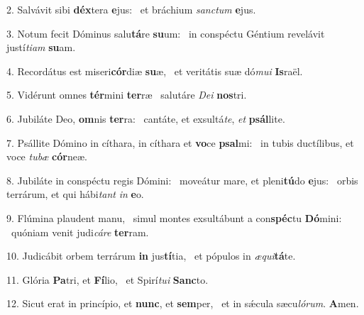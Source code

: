 2. Salvávit sibi \textbf{déx}tera \textbf{e}jus: \ast\  et bráchium \textit{sanc}\textit{tum} \textbf{e}jus.\

3. Notum fecit Dóminus salu\textbf{tá}re \textbf{su}um: \ast\  in conspéctu Géntium revelávit justí\textit{ti}\textit{am} \textbf{su}am.\

4. Recordátus est miseri\textbf{cór}diæ \textbf{su}æ, \ast\  et veritátis suæ dó\textit{mu}\textit{i} \textbf{Is}raël.\

5. Vidérunt omnes \textbf{tér}mini \textbf{ter}ræ \ast\  salutáre \textit{De}\textit{i} \textbf{nos}tri.\

6. Jubiláte Deo, \textbf{om}nis \textbf{ter}ra: \ast\  cantáte, et exsultá\textit{te}, \textit{et} \textbf{psál}lite.\

7. Psállite Dómino in cíthara, in cíthara et \textbf{vo}ce \textbf{psal}mi: \ast\  in tubis ductílibus, et voce \textit{tu}\textit{bæ} \textbf{cór}neæ.\

8. Jubiláte in conspéctu regis Dómini: \dag\  moveátur mare, et pleni\textbf{tú}do \textbf{e}jus: \ast\  orbis terrárum, et qui hábi\textit{tant} \textit{in} \textbf{e}o.\

9. Flúmina plaudent manu, \dag\  simul montes exsultábunt a con\textbf{spéc}tu \textbf{Dó}mini: \ast\  quóniam venit judi\textit{cá}\textit{re} \textbf{ter}ram.\

10. Judicábit orbem terrárum \textbf{in} jus\textbf{tí}tia, \ast\  et pópulos in \textit{æ}\textit{qui}\textbf{tá}te.\

11. Glória \textbf{Pa}tri, et \textbf{Fí}lio, \ast\  et Spirí\textit{tu}\textit{i} \textbf{Sanc}to.\

12. Sicut erat in princípio, et \textbf{nunc}, et \textbf{sem}per, \ast\  et in sǽcula sæcu\textit{ló}\textit{rum}. \textbf{A}men.\

